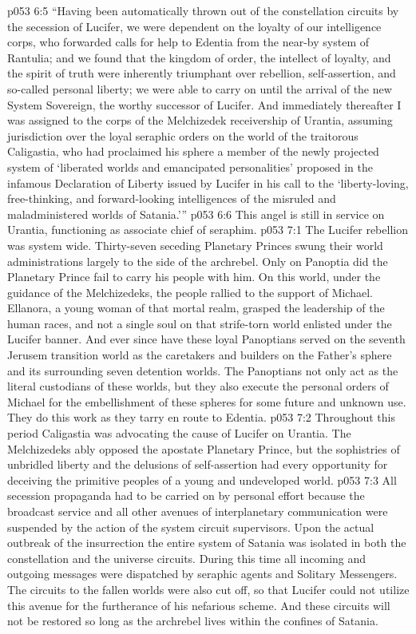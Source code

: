 \vs p053 6:5 “Having been automatically thrown out of the constellation circuits by the secession of Lucifer, we were dependent on the loyalty of our intelligence corps, who forwarded calls for help to Edentia from the near\hyp{}by system of Rantulia; and we found that the kingdom of order, the intellect of loyalty, and the spirit of truth were inherently triumphant over rebellion, self\hyp{}assertion, and so\hyp{}called personal liberty; we were able to carry on until the arrival of the new System Sovereign, the worthy successor of Lucifer. And immediately thereafter I was assigned to the corps of the Melchizedek receivership of Urantia, assuming jurisdiction over the loyal seraphic orders on the world of the traitorous Caligastia, who had proclaimed his sphere a member of the newly projected system of ‘liberated worlds and emancipated personalities’ proposed in the infamous Declaration of Liberty issued by Lucifer in his call to the ‘liberty\hyp{}loving, free\hyp{}thinking, and forward\hyp{}looking intelligences of the misruled and maladministered worlds of Satania.’”
\pc \vs p053 6:6 This angel is still in service on Urantia, functioning as associate chief of seraphim.
\vs p053 7:1 The Lucifer rebellion was system wide. Thirty\hyp{}seven seceding Planetary Princes swung their world administrations largely to the side of the archrebel. Only on Panoptia did the Planetary Prince fail to carry his people with him. On this world, under the guidance of the Melchizedeks, the people rallied to the support of Michael. Ellanora, a young woman of that mortal realm, grasped the leadership of the human races, and not a single soul on that strife\hyp{}torn world enlisted under the Lucifer banner. And ever since have these loyal Panoptians served on the seventh Jerusem transition world as the caretakers and builders on the Father’s sphere and its surrounding seven detention worlds. The Panoptians not only act as the literal custodians of these worlds, but they also execute the personal orders of Michael for the embellishment of these spheres for some future and unknown use. They do this work as they tarry en route to Edentia.\plusone
\vs p053 7:2 Throughout this period Caligastia was advocating the cause of Lucifer on Urantia. The Melchizedeks ably opposed the apostate Planetary Prince, but the sophistries of unbridled liberty and the delusions of self\hyp{}assertion had every opportunity for deceiving the primitive peoples of a young and undeveloped world.
\vs p053 7:3 All secession propaganda had to be carried on by personal effort because the broadcast service and all other avenues of interplanetary communication were suspended by the action of the system circuit supervisors. Upon the actual outbreak of the insurrection the entire system of Satania was isolated in both the constellation and the universe circuits. During this time all incoming and outgoing messages were dispatched by seraphic agents and Solitary Messengers. The circuits to the fallen worlds were also cut off, so that Lucifer could not utilize this avenue for the furtherance of his nefarious scheme. And these circuits will not be restored so long as the archrebel lives within the confines of Satania.
